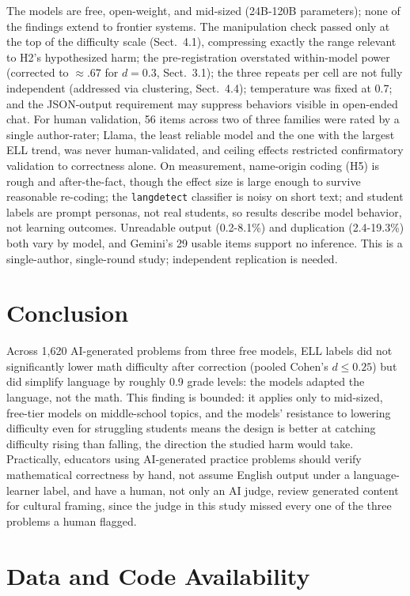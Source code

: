 \documentclass[runningheads]{llncs}
\begin{document}
The models are free, open-weight, and mid-sized (24B-120B parameters); none of the findings extend to frontier systems. The manipulation check passed only at the top of the difficulty scale (Sect.~4.1), compressing exactly the range relevant to H2's hypothesized harm; the pre-registration overstated within-model power (corrected to $\approx.67$ for $d=0.3$, Sect.~3.1); the three repeats per cell are not fully independent (addressed via clustering, Sect.~4.4); temperature was fixed at 0.7; and the JSON-output requirement may suppress behaviors visible in open-ended chat. For human validation, 56 items across two of three families were rated by a single author-rater; Llama, the least reliable model and the one with the largest ELL trend, was never human-validated, and ceiling effects restricted confirmatory validation to correctness alone. On measurement, name-origin coding (H5) is rough and after-the-fact, though the effect size is large enough to survive reasonable re-coding; the \texttt{langdetect} classifier is noisy on short text; and student labels are prompt personas, not real students, so results describe model behavior, not learning outcomes. Unreadable output (0.2-8.1\%) and duplication (2.4-19.3\%) both vary by model, and Gemini's 29 usable items support no inference. This is a single-author, single-round study; independent replication is needed.

\section{Conclusion}

Across 1,620 AI-generated problems from three free models, ELL labels did not significantly lower math difficulty after correction (pooled Cohen's $d \leq 0.25$) but did simplify language by roughly 0.9 grade levels: the models adapted the language, not the math. This finding is bounded: it applies only to mid-sized, free-tier models on middle-school topics, and the models' resistance to lowering difficulty even for struggling students means the design is better at catching difficulty rising than falling, the direction the studied harm would take. Practically, educators using AI-generated practice problems should verify mathematical correctness by hand, not assume English output under a language-learner label, and have a human, not only an AI judge, review generated content for cultural framing, since the judge in this study missed every one of the three problems a human flagged.

\section*{Data and Code Availability}
\end{document}
